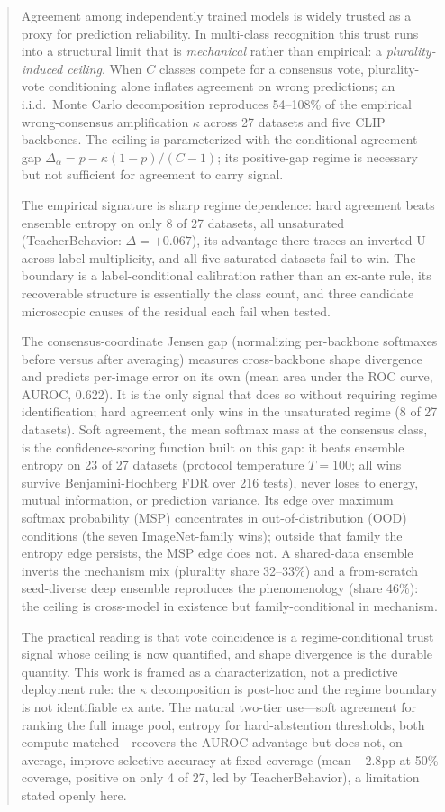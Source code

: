 \documentclass[a4paper,fleqn]{cas-sc}
\begin{document}
\begin{abstract}Agreement among independently trained models is widely trusted as a proxy for prediction reliability.
In multi-class recognition this trust runs into a structural limit that is \emph{mechanical} rather than empirical: a \emph{plurality-induced ceiling}.
When $C$ classes compete for a consensus vote, plurality-vote conditioning alone inflates agreement on wrong predictions; an i.i.d.\ Monte Carlo decomposition reproduces 54--108\% of the empirical wrong-consensus amplification $\kappa$ across 27 datasets and five CLIP backbones.
The ceiling is parameterized with the conditional-agreement gap $\Delta_\alpha = p - \kappa(1-p)/(C-1)$; its positive-gap regime is necessary but not sufficient for agreement to carry signal.

The empirical signature is sharp regime dependence: hard agreement beats ensemble entropy on only 8 of 27 datasets, all unsaturated (TeacherBehavior: $\Delta = +0.067$), its advantage there traces an inverted-U across label multiplicity, and all five saturated datasets fail to win.
The boundary is a label-conditional calibration rather than an ex-ante rule, its recoverable structure is essentially the class count, and three candidate microscopic causes of the residual each fail when tested.

The consensus-coordinate Jensen gap (normalizing per-backbone softmaxes before versus after averaging) measures cross-backbone shape divergence and predicts per-image error on its own (mean area under the ROC curve, AUROC, 0.622). It is the only signal that does so without requiring regime identification; hard agreement only wins in the unsaturated regime (8 of 27 datasets).
Soft agreement, the mean softmax mass at the consensus class, is the confidence-scoring function built on this gap: it beats ensemble entropy on 23 of 27 datasets (protocol temperature $T{=}100$; all wins survive Benjamini-Hochberg FDR over 216 tests), never loses to energy, mutual information, or prediction variance. Its edge over maximum softmax probability (MSP) concentrates in out-of-distribution (OOD) conditions (the seven ImageNet-family wins); outside that family the entropy edge persists, the MSP edge does not.
A shared-data ensemble inverts the mechanism mix (plurality share 32--33\%) and a from-scratch seed-diverse deep ensemble reproduces the phenomenology (share 46\%): the ceiling is cross-model in existence but family-conditional in mechanism.

The practical reading is that vote coincidence is a regime-conditional trust signal whose ceiling is now quantified, and shape divergence is the durable quantity.
This work is framed as a characterization, not a predictive deployment rule: the $\kappa$ decomposition is post-hoc and the regime boundary is not identifiable ex ante. The natural two-tier use---soft agreement for ranking the full image pool, entropy for hard-abstention thresholds, both compute-matched---recovers the AUROC advantage but does not, on average, improve selective accuracy at fixed coverage (mean $-2.8$pp at 50\% coverage, positive on only 4 of 27, led by TeacherBehavior), a limitation stated openly here.\end{abstract}
\end{document}
